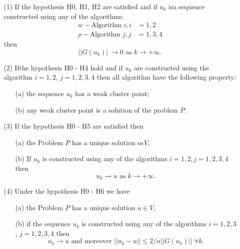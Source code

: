 \begin{theorem}\label{chap3-thm1.1}
\begin{enumerate}
\item[(1)] If the hypothesis H0, H1, H2 are satisfied and if $u_{k}$ isa sequence constructed using any of the algorithms:
\begin{align*}
 w-\text{Algorithm } i, i & = 1, 2\\
 \rho-\text{Algorithm } j, j & = 1, 3, 4 
\end{align*}
then 
$$
||G(u_{k})|\ \to 0 \text{ as } k \to + \infty.
$$

\item[(2)] If\pageoriginale the hypothesis H0 - H4 hold and if $u_{k}$ are constructed using the algorithm $i = 1, 2$,  $j = 1, 2, 3, 4$ then all algorithm have the following property:
\begin{enumerate}
\item[(a)] the sequence $u_{k}$ has a weak cluster point;

\item[(b)] any weak cluster point is a solution of the problem $P$.
\end{enumerate}

\item[(3)] If the hypothesis H0 - H5 are satisfied then
\begin{enumerate}
\item[(a)] the Problem $P$ has a unique solution $u \epsilon V$,

\item[(b)] If $u_{k}$ is constructed using any of the algorithms $i = 1, 2, j = 1, 2, 3, 4$ then
$$
u_{k} \rightharpoonup u \text{ as } k \to + \infty.
$$
\end{enumerate}
\item[(4)] Under the hypothesis H0 - H6 we have
\begin{enumerate}
\item[(a)] the Problem $P$ has a unique solution $u \in V$,

\item[(b)] if the sequence $u_{k}$ is constructed using any of the algorithms $i = 1, 2, 3$, $j = 1, 2, 3, 4$ then
$$
u_{k} \to u \text{ and moreover } ||u_{k} - u|| \leq 2 / \alpha ||G(u_{k})|| \; \forall k.
$$
\end{enumerate}
\end{enumerate}
\end{theorem}

